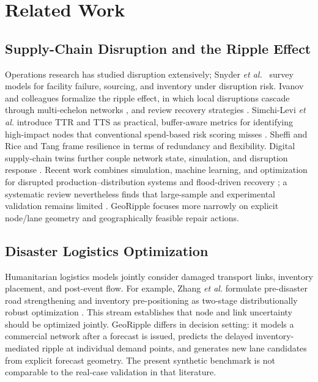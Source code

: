 \documentclass[conference]{IEEEtran}
\begin{document}
\section{Related Work}
\subsection{Supply-Chain Disruption and the Ripple Effect}
Operations research has studied disruption extensively; Snyder
\textit{et al.}~\cite{snyder2016} survey models for facility failure,
sourcing, and inventory under disruption risk. Ivanov and colleagues
formalize the ripple effect, in which local disruptions cascade through
multi-echelon networks \cite{ivanov2017ripple,dolgui2018ripple}, and
review recovery strategies \cite{ivanov2017review}. Simchi-Levi
\textit{et al.} introduce TTR and TTS as practical, buffer-aware metrics
for identifying high-impact nodes that conventional spend-based risk
scoring misses \cite{simchilevi2014,simchilevi2015}. Sheffi and Rice
\cite{sheffi2005} and Tang \cite{tang2006} frame resilience in terms of
redundancy and flexibility. Digital supply-chain twins further couple
network state, simulation, and disruption response
\cite{ivanov2021twin,ivanov2025twins}. Recent work combines simulation,
machine learning, and optimization for disrupted production--distribution
systems \cite{corsini2024} and flood-driven recovery \cite{ogunsoto2025}; a
systematic review nevertheless finds that large-sample and experimental
validation remains limited \cite{liu2026}. GeoRipple focuses more narrowly on
explicit node/lane geometry and geographically feasible repair actions.

\subsection{Disaster Logistics Optimization}
Humanitarian logistics models jointly consider damaged transport links,
inventory placement, and post-event flow. For example, Zhang
\textit{et al.} formulate pre-disaster road strengthening and inventory
pre-positioning as two-stage distributionally robust optimization
\cite{zhang2023}. This stream establishes that node and link uncertainty
should be optimized jointly. GeoRipple differs in decision setting: it models
a commercial network after a forecast is issued, predicts the delayed
inventory-mediated ripple at individual demand points, and generates new
lane candidates from explicit forecast geometry. The present synthetic
benchmark is not comparable to the real-case validation in that literature.
\end{document}
